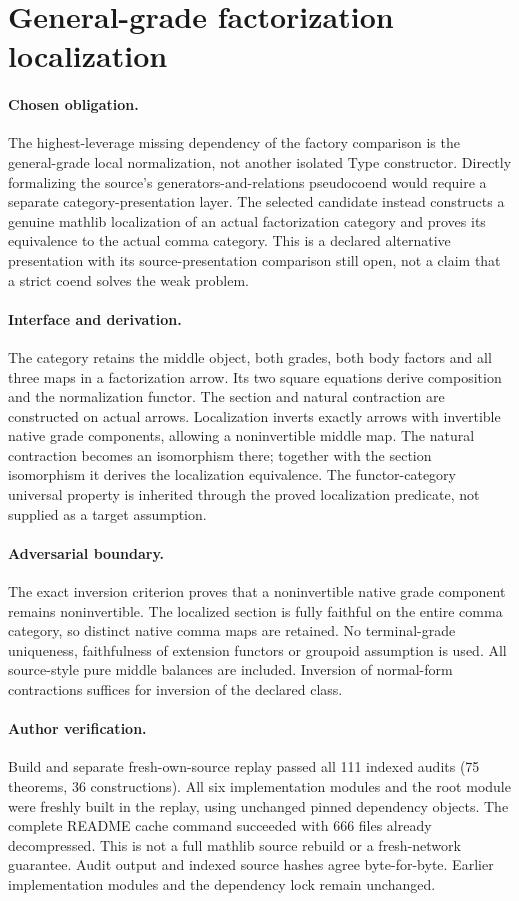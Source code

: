 \documentclass{article}
\begin{document}
\section*{General-grade factorization localization}
\paragraph{Chosen obligation.} The highest-leverage missing dependency of the factory comparison is the general-grade local normalization, not another isolated Type constructor. Directly formalizing the source's generators-and-relations pseudocoend would require a separate category-presentation layer. The selected candidate instead constructs a genuine mathlib localization of an actual factorization category and proves its equivalence to the actual comma category. This is a declared alternative presentation with its source-presentation comparison still open, not a claim that a strict coend solves the weak problem.
\paragraph{Interface and derivation.} The category retains the middle object, both grades, both body factors and all three maps in a factorization arrow. Its two square equations derive composition and the normalization functor. The section and natural contraction are constructed on actual arrows. Localization inverts exactly arrows with invertible native grade components, allowing a noninvertible middle map. The natural contraction becomes an isomorphism there; together with the section isomorphism it derives the localization equivalence. The functor-category universal property is inherited through the proved localization predicate, not supplied as a target assumption.
\paragraph{Adversarial boundary.} The exact inversion criterion proves that a noninvertible native grade component remains noninvertible. The localized section is fully faithful on the entire comma category, so distinct native comma maps are retained. No terminal-grade uniqueness, faithfulness of extension functors or groupoid assumption is used. All source-style pure middle balances are included. Inversion of normal-form contractions suffices for inversion of the declared class.
\paragraph{Author verification.} Build and separate fresh-own-source replay passed all 111 indexed audits (75 theorems, 36 constructions). All six implementation modules and the root module were freshly built in the replay, using unchanged pinned dependency objects. The complete README cache command succeeded with 666 files already decompressed. This is not a full mathlib source rebuild or a fresh-network guarantee. Audit output and indexed source hashes agree byte-for-byte. Earlier implementation modules and the dependency lock remain unchanged.
\end{document}
